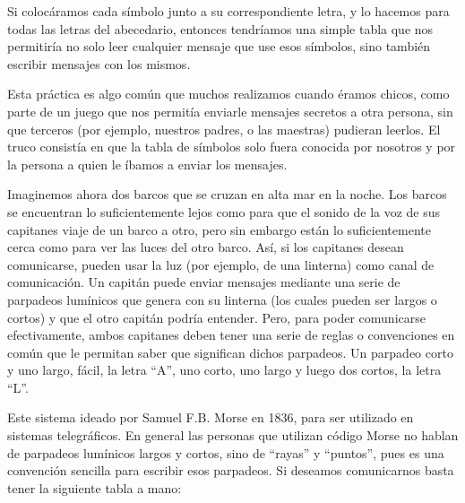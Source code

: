 Si colocáramos cada símbolo junto a su correspondiente letra, y lo hacemos para
todas las letras del abecedario, entonces tendríamos una simple tabla que nos
permitiría no solo leer cualquier mensaje que use esos símbolos, sino también
escribir mensajes con los mismos.

Esta práctica es algo común que muchos realizamos cuando éramos chicos, como
parte de un juego que nos permitía enviarle mensajes secretos a otra persona,
sin que terceros (por ejemplo, nuestros padres, o las maestras) pudieran
leerlos. El truco consistía en que la tabla de símbolos solo fuera conocida por
nosotros y por la persona a quien le íbamos a enviar los mensajes.

Imaginemos ahora dos barcos que se cruzan en alta mar en la noche. Los barcos se
encuentran lo suficientemente lejos como para que el sonido de la voz de sus
capitanes viaje de un barco a otro, pero sin embargo están lo suficientemente
cerca como para ver las luces del otro barco. Así, si los capitanes desean
comunicarse, pueden usar la luz (por ejemplo, de una linterna) como canal de
comunicación. Un capitán puede enviar mensajes mediante una serie de parpadeos
lumínicos que genera con su linterna (los cuales pueden ser largos o cortos) y
que el otro capitán podría entender. Pero, para poder comunicarse efectivamente,
ambos capitanes deben tener una serie de reglas o convenciones en común que le
permitan saber que significan dichos parpadeos. Un parpadeo corto y uno largo,
fácil, la letra ``A'', uno corto, uno largo y luego dos cortos, la letra ``L''.

Este sistema ideado por Samuel F.B. Morse en 1836, para ser utilizado en
sistemas telegráficos. En general las personas que utilizan código Morse no
hablan de parpadeos lumínicos largos y cortos, sino de ``rayas'' y ``puntos'',
pues es una convención sencilla para escribir esos parpadeos. Si deseamos
comunicarnos basta tener la siguiente tabla a mano:

